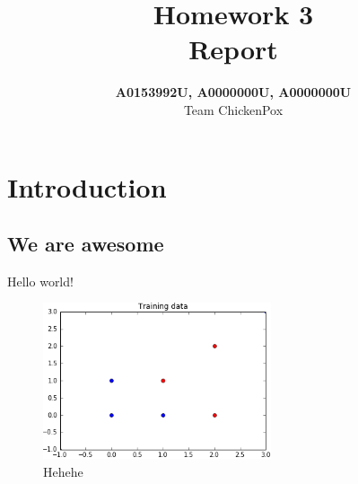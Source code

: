 \documentclass[a4paper]{article}
\title{Homework 3 \\ \large Report}
\author{\textbf{A0153992U, A0000000U, A0000000U} \\ Team ChickenPox}
\date{}
\numberwithin{equation}{section}
\begin{document}
\maketitle

\section{Introduction}

\subsection{We are awesome}

Hello world!

\begin{figure}[h!]
	\centering
	\includegraphics[page=1,width=0.60\textwidth]{diagram.png}
	\caption{\label{fig:diagram}{Hehehe}}
\end{figure}
\end{document}
